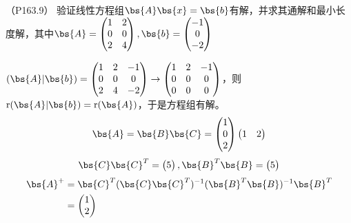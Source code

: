 \documentclass[12pt, a4paper, oneside, UTF8]{ctexbook}
\begin{document}
\begin{question}（P163.9）
    验证线性方程组$\bs{A}\bs{x}=\bs{b}$有解，并求其通解和最小长度解，其中$\bs{A}=\begin{pmatrix}
        1&2\\
        0&0\\
        2&4
    \end{pmatrix},\bs{b}=\begin{pmatrix}
        -1\\
        0\\
        -2
    \end{pmatrix}$
\end{question}

\begin{solution}
    $(\bs{A}|\bs{b})=\begin{pmatrix}
        1&2&-1\\
        0&0&0\\
        2&4&-2
    \end{pmatrix} \rightarrow \begin{pmatrix}
        1&2&-1\\
        0&0&0\\
        0&0&0
    \end{pmatrix}$，则$\mathrm{r}(\bs{A}|\bs{b})=\mathrm{r}(\bs{A})$，于是方程组有解。
    \begin{align*}
        \bs{A}=\bs{B}\bs{C}=\begin{pmatrix}
            1\\
            0\\
            2
        \end{pmatrix}\begin{pmatrix}
            1&2
        \end{pmatrix}
    \end{align*}
    \begin{align*}
        \bs{C}\bs{C}^T=\begin{pmatrix}
            5
        \end{pmatrix},\bs{B}^T\bs{B}=\begin{pmatrix}
            5
        \end{pmatrix}
    \end{align*}
    \begin{align*}
        \bs{A}^+&=\bs{C}^T(\bs{C}\bs{C}^T)^{-1}(\bs{B}^T\bs{B})^{-1}\bs{B}^T\\
        &=\begin{pmatrix}
            1\\
            2

\end{pmatrix}
\end{align*}
\end{solution}
\end{document}
